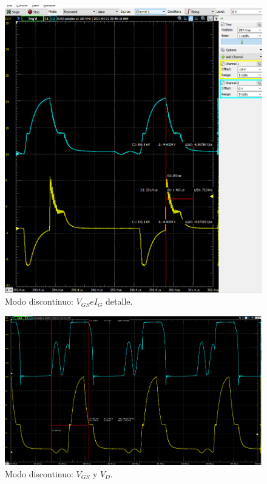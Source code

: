 \begin{figure}[H]
	\centering
	\includegraphics[width=\linewidth]{Imagenes/Discontinuo_VGS_IG_2}
	\caption{Modo discontinuo: $V_{GS} e I_G $ detalle.}
	\label{fig:DISC_VGS_IG_2}
\end{figure}
\begin{figure}[H]
	\centering
	\includegraphics[width=\linewidth]{Imagenes/Discontinuo_VGS_VDiodo}
	\caption{Modo discontinuo: $V_{GS}$ y $V_D$.}
	\label{fig:DISC_VGS_VD}
\end{figure}
